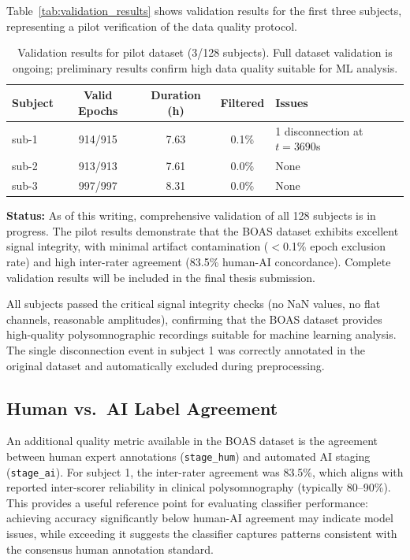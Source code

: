 \documentclass{imc-inf} %
\begin{document}
Table~\ref{tab:validation_results} shows validation results for the first three 
subjects, representing a pilot verification of the data quality protocol. 

\begin{table}[ht]
\centering
\begin{tabular}{|l|c|c|c|l|}
\hline
\textbf{Subject} & \textbf{Valid Epochs} & \textbf{Duration (h)} & \textbf{Filtered} & \textbf{Issues} \\
\hline
sub-1 & 914/915 & 7.63 & 0.1\% & 1 disconnection at $t=3690$s \\
\hline
sub-2 & 913/913 & 7.61 & 0.0\% & None \\
\hline
sub-3 & 997/997 & 8.31 & 0.0\% & None \\
\hline
\end{tabular}
\caption{Validation results for pilot dataset (3/128 subjects). Full dataset 
validation is ongoing; preliminary results confirm high data quality suitable 
for ML analysis.}
\end{table}

\textbf{Status:} As of this writing, comprehensive validation of all 128 subjects 
is in progress. The pilot results demonstrate that the BOAS dataset exhibits 
excellent signal integrity, with minimal artifact contamination ($<$0.1\% epoch 
exclusion rate) and high inter-rater agreement (83.5\% human-AI concordance). 
Complete validation results will be included in the final thesis submission.

All subjects passed the critical signal integrity checks (no NaN values, no flat channels, reasonable amplitudes), confirming that the BOAS dataset provides high-quality polysomnographic recordings suitable for machine learning analysis. The single disconnection event in subject 1 was correctly annotated in the original dataset and automatically excluded during preprocessing.


\subsection{Human vs.\ AI Label Agreement}

An additional quality metric available in the BOAS dataset is the agreement between human expert annotations (\verb|stage_hum|) and automated AI staging (\verb|stage_ai|). For subject 1, the inter-rater agreement was 83.5\%, which aligns with reported inter-scorer reliability in clinical polysomnography (typically 80--90\%). This provides a useful reference point for evaluating classifier performance: achieving accuracy significantly below human-AI agreement may indicate model issues, while exceeding it suggests the classifier captures patterns consistent with  the consensus human annotation standard.
\end{document}
